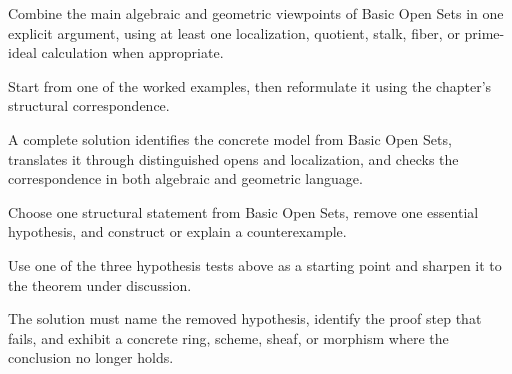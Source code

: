 \begin{exercise}\label{exr:vi08-expand-15}
Combine the main algebraic and geometric viewpoints of Basic Open Sets in one explicit argument, using at least one localization, quotient, stalk, fiber, or prime-ideal calculation when appropriate.
\end{exercise}
\begin{hint}
Start from one of the worked examples, then reformulate it using the chapter's structural correspondence.
\end{hint}
\begin{solution}
A complete solution identifies the concrete model from Basic Open Sets, translates it through distinguished opens and localization, and checks the correspondence in both algebraic and geometric language.
\end{solution}

\begin{exercise}\label{exr:vi08-expand-16}
Choose one structural statement from Basic Open Sets, remove one essential hypothesis, and construct or explain a counterexample.
\end{exercise}
\begin{hint}
Use one of the three hypothesis tests above as a starting point and sharpen it to the theorem under discussion.
\end{hint}
\begin{solution}
The solution must name the removed hypothesis, identify the proof step that fails, and exhibit a concrete ring, scheme, sheaf, or morphism where the conclusion no longer holds.
\end{solution}

